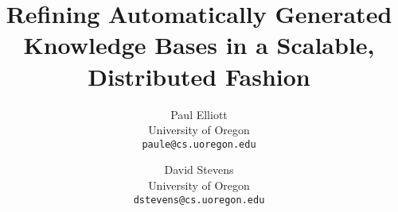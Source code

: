 \documentclass[letterpaper,10pt]{article}
\date{}
\begin{document}
\setcounter{page}{1}
\pagestyle{plain}


\title{\bf Refining Automatically Generated Knowledge Bases in a Scalable, Distributed Fashion}
\author{
{Paul Elliott}\\
University of Oregon\\
\texttt{paule@cs.uoregon.edu}
\and
{David Stevens}\\
University of Oregon\\
\texttt{dstevens@cs.uoregon.edu}
}

\maketitle


\end{document}
